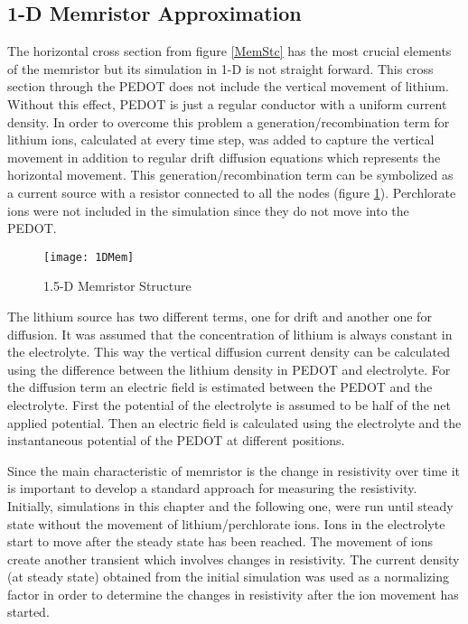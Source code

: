 \begin{doublespace}
\clearpage
\section{1-D Memristor Approximation}

The horizontal cross section from figure \ref{MemStc} has the most crucial elements of the memristor but its simulation in 1-D is not straight forward. This cross section through the PEDOT does not include the vertical movement of lithium. Without this effect, PEDOT is just a regular conductor with a uniform current density. In order to overcome this problem a generation/recombination term for lithium ions, calculated at every time step, was added to capture the vertical movement in addition to regular drift diffusion equations which represents the horizontal movement. This generation/recombination term can be symbolized as a current source with a resistor connected to all the nodes (figure \ref{MemStc15}). Perchlorate ions were not included in the simulation since they do not move into the PEDOT.

\begin{figure}[!htp]
\centering
\texttt{[image: 1DMem]}
\caption{1.5-D Memristor Structure} 
\label{MemStc15}
\end{figure}

The lithium source has two different terms, one for drift and another one for diffusion. It was assumed that the concentration of lithium is always constant in the electrolyte. This way the vertical diffusion current density can be calculated using the difference between the lithium density in PEDOT and electrolyte. For the diffusion term an electric field is estimated between the PEDOT and the electrolyte. First the potential of the electrolyte is assumed to be half of the net applied potential. Then an electric field is calculated using the electrolyte and the instantaneous potential of the PEDOT at different positions.

Since the main characteristic of memristor is the change in resistivity over time it is important to develop a standard approach for measuring the resistivity. Initially, simulations in this chapter and the following one, were run until steady state without the movement of lithium/perchlorate ions. Ions in the electrolyte start to move after the steady state has been reached. The movement of ions create another transient which involves changes in resistivity. The current density (at steady state) obtained from the initial simulation was used as a normalizing factor in order to determine the changes in resistivity after the ion movement has started.


\end{doublespace}
